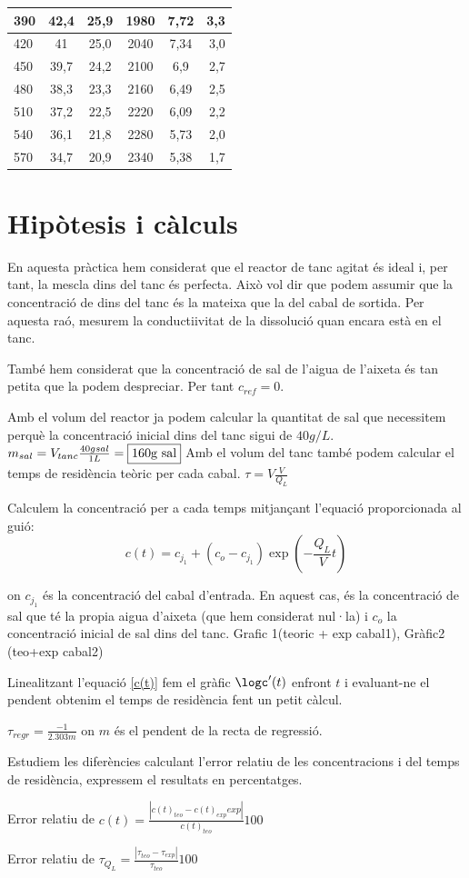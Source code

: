 \documentclass[10pt, twoside]{article}
\begin{document}
\begin{minipage}{\textwidth}
\begin{tabular}{|l|c|c|c|c|r|}
        390	&	42,4	&	25,9	&	1980	&	7,72	&	3,3	\\ \hline
        420	&	41	&	25,0	&	2040	&	7,34	&	3,0	\\ \hline
        450	&	39,7	&	24,2	&	2100	&	6,9	&	2,7	\\ \hline
        480	&	38,3	&	23,3	&	2160	&	6,49	&	2,5	\\ \hline
        510	&	37,2	&	22,5	&	2220	&	6,09	&	2,2	\\ \hline
        540	&	36,1	&	21,8	&	2280	&	5,73	&	2,0	\\ \hline
        570	&	34,7	&	20,9	&	2340	&	5,38	&	1,7	\\ \hline
    \end{tabular}
\end{minipage}

\section{Hipòtesis i càlculs}

En aquesta pràctica hem considerat que el reactor de tanc agitat és ideal i, per tant, la mescla dins del tanc és perfecta. Això vol dir que podem assumir que la concentració de dins del tanc és la mateixa que la del cabal de sortida. Per aquesta raó, mesurem la conductiivitat de la dissolució quan encara està en el tanc.

També hem considerat que la concentració de sal de l'aigua de l'aixeta és tan petita que la podem despreciar. Per tant $c_{ref} = 0$.

Amb el volum del reactor ja podem calcular la quantitat de sal que necessitem perquè la concentració inicial dins del tanc sigui de $40g/L$. 
    $m_{sal} = V_{tanc}\frac{40g sal}{1L} = \fbox{160g sal}$
Amb el volum del tanc també podem calcular el temps de residència teòric per cada cabal.
    $\tau = V\frac{V}{Q_L}$

Calculem la concentració per a cada temps mitjançant l'equació proporcionada al guió:
\begin{equation}
    c(t) = c_{j_1} + (c_o-c_{j_1})\exp\left(-\frac{Q_L}{V}t\right) 
    \label{c(t)}   
\end{equation}

on $c_{j_1}$ és la concentració del cabal d'entrada. En aquest cas, és la concentració de sal que té la propia aigua d'aixeta (que hem considerat nul·la) i $c_o$ la concentració inicial de sal dins del tanc.
Grafic 1(teoric + exp cabal1), Gràfic2 (teo+exp cabal2)

Linealitzant l'equació \eqref{c(t)} fem el gràfic $\logc'(t)$ enfront $t$ i evaluant-ne el pendent obtenim el temps de residència fent un petit càlcul.

$\tau_{regr} = \frac{-1}{2.303m}$ on $m$ és el pendent de la recta de regressió.

Estudiem les diferències calculant l'error relatiu de les concentracions i del temps de residència, expressem el resultats en percentatges.

Error  relatiu  de  $c(t) = \frac{|c(t)_{teo} - c(t)_{exp} exp|}{c(t)_{teo}} 100$

Error relatiu de $\tau_{Q_L} = \frac{|\tau_{teo} - \tau_{exp}|}{\tau_{teo}} 100$
\end{document}
